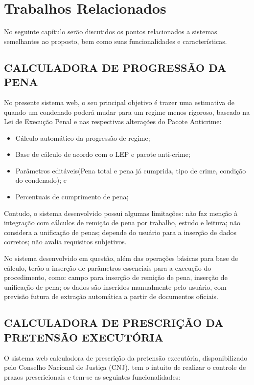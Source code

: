 
\chapter{Trabalhos Relacionados}
No seguinte capítulo serão discutidos os pontos relacionados a sistemas semelhantes ao proposto, bem como suas funcionalidades e características. 

\section{CALCULADORA DE PROGRESSÃO DA PENA}
No presente sistema web, o seu principal objetivo é trazer uma estimativa de quando um condenado poderá mudar para um regime menos rigoroso, baseado na Lei de Execução Penal  e nas respectivas alterações do Pacote Anticrime:\cite{jurisdiques}

\begin{itemize}
    \item Cálculo automático da progressão de regime;
    \item Base de cálculo de acordo com o LEP e pacote anti-crime;
    \item Parâmetros editáveis(Pena total e pena já cumprida, tipo de crime, condição do condenado); e
    \item Percentuais de cumprimento de pena;
\end{itemize}

Contudo, o sistema desenvolvido possui algumas limitações: não faz menção à integração com cálculos de remição de pena por trabalho, estudo e leitura; não considera a unificação de penas; depende do usuário para a inserção de dados corretos; não avalia requisitos subjetivos.

No sistema desenvolvido em questão, além das operações básicas para base de cálculo, terão a inserção de parâmetros essenciais para a execução do procedimento, como: campo para inserção de remição de pena, inserção de unificação de pena; os dados são inseridos manualmente pelo usuário, com previsão futura 
de extração automática a partir de documentos oficiais.

\section{CALCULADORA DE PRESCRIÇÃO DA PRETENSÃO EXECUTÓRIA}
O sistema web  calculadora de prescrição da pretensão executória, disponibilizado pelo Conselho Nacional de Justiça (CNJ),  tem o intuito de realizar o  controle de prazos prescricionais e tem-se as seguintes funcionalidades:\cite{cnjCalculadora}

